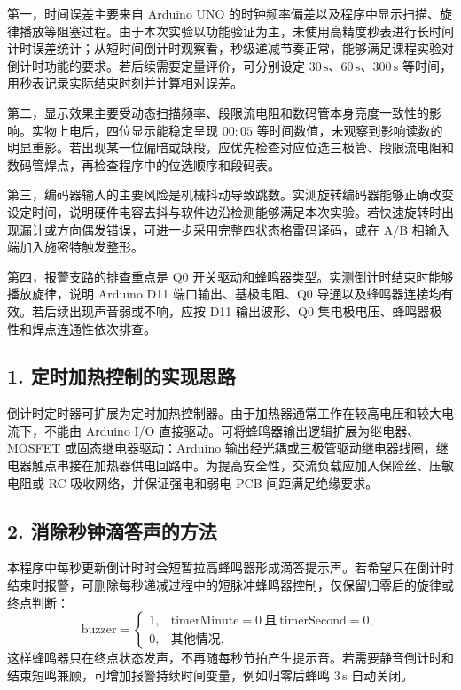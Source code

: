 \documentclass[UTF8,a4paper,12pt]{ctexart}
\newcounter{makepart}
\begin{document}
第一，时间误差主要来自 Arduino UNO 的时钟频率偏差以及程序中显示扫描、旋律播放等阻塞过程。由于本次实验以功能验证为主，未使用高精度秒表进行长时间计时误差统计；从短时间倒计时观察看，秒级递减节奏正常，能够满足课程实验对倒计时功能的要求。若后续需要定量评价，可分别设定 $30\,\mathrm{s}$、$60\,\mathrm{s}$、$300\,\mathrm{s}$ 等时间，用秒表记录实际结束时刻并计算相对误差。

第二，显示效果主要受动态扫描频率、段限流电阻和数码管本身亮度一致性的影响。实物上电后，四位显示能稳定呈现 $00:05$ 等时间数值，未观察到影响读数的明显重影。若出现某一位偏暗或缺段，应优先检查对应位选三极管、段限流电阻和数码管焊点，再检查程序中的位选顺序和段码表。

第三，编码器输入的主要风险是机械抖动导致跳数。实测旋转编码器能够正确改变设定时间，说明硬件电容去抖与软件边沿检测能够满足本次实验。若快速旋转时出现漏计或方向偶发错误，可进一步采用完整四状态格雷码译码，或在 A/B 相输入端加入施密特触发整形。

第四，报警支路的排查重点是 Q0 开关驱动和蜂鸣器类型。实测倒计时结束时能够播放旋律，说明 Arduino D11 端口输出、基极电阻、Q0 导通以及蜂鸣器连接均有效。若后续出现声音弱或不响，应按 D11 输出波形、Q0 集电极电压、蜂鸣器极性和焊点连通性依次排查。


\subsection*{1. 定时加热控制的实现思路}

倒计时定时器可扩展为定时加热控制器。由于加热器通常工作在较高电压和较大电流下，不能由 Arduino I/O 直接驱动。可将蜂鸣器输出逻辑扩展为继电器、MOSFET 或固态继电器驱动：Arduino 输出经光耦或三极管驱动继电器线圈，继电器触点串接在加热器供电回路中。为提高安全性，交流负载应加入保险丝、压敏电阻或 RC 吸收网络，并保证强电和弱电 PCB 间距满足绝缘要求。

\subsection*{2. 消除秒钟滴答声的方法}

本程序中每秒更新倒计时时会短暂拉高蜂鸣器形成滴答提示声。若希望只在倒计时结束时报警，可删除每秒递减过程中的短脉冲蜂鸣器控制，仅保留归零后的旋律或终点判断：
\[
  \text{buzzer}= 
  \begin{cases}
    1, & \text{timerMinute}=0\ \text{且}\ \text{timerSecond}=0,\\
    0, & \text{其他情况}.
  \end{cases}
\]
这样蜂鸣器只在终点状态发声，不再随每秒节拍产生提示音。若需要静音倒计时和结束短鸣兼顾，可增加报警持续时间变量，例如归零后蜂鸣 $3\,\mathrm{s}$ 自动关闭。
\end{document}
